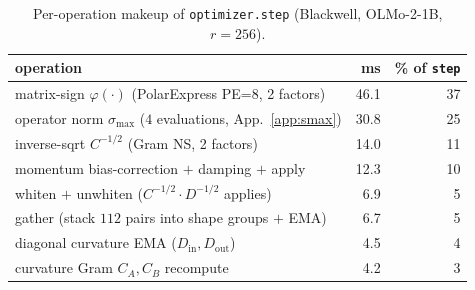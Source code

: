 \documentclass[11pt]{article}
\newcommand{\smax}{\sigma_{\max}}
\newcommand{\polar}{\varphi}                 %
\theoremstyle{plain}
\theoremstyle{definition}
\theoremstyle{remark}
\begin{document}
\begin{table}[h]\centering\small
\begin{tabular}{lrr}
\toprule
operation & ms & \% of \texttt{step} \\
\midrule
matrix-sign $\polar(\cdot)$ (PolarExpress PE=8, 2 factors)       & 46.1 & 37 \\
operator norm $\smax$ ($4$ evaluations, App.~\ref{app:smax})     & 30.8 & 25 \\
inverse-sqrt $C^{-1/2}$ (Gram NS, 2 factors)                     & 14.0 & 11 \\
momentum bias-correction $+$ damping $+$ apply                   & 12.3 & 10 \\
whiten $+$ unwhiten ($C^{-1/2}\!\cdot\!D^{-1/2}$ applies)        &  6.9 &  5 \\
gather (stack $112$ pairs into shape groups $+$ EMA)            &  6.7 &  5 \\
diagonal curvature EMA ($D_{\mathrm{in}},D_{\mathrm{out}}$)      &  4.5 &  4 \\
curvature Gram $C_A,C_B$ recompute                               &  4.2 &  3 \\
\bottomrule
\end{tabular}
\caption{Per-operation makeup of \texttt{optimizer.step} (Blackwell, OLMo-2-1B, $r{=}256$).}
\label{tab:walltime-ops}
\end{table}

\printbibliography
\end{document}
